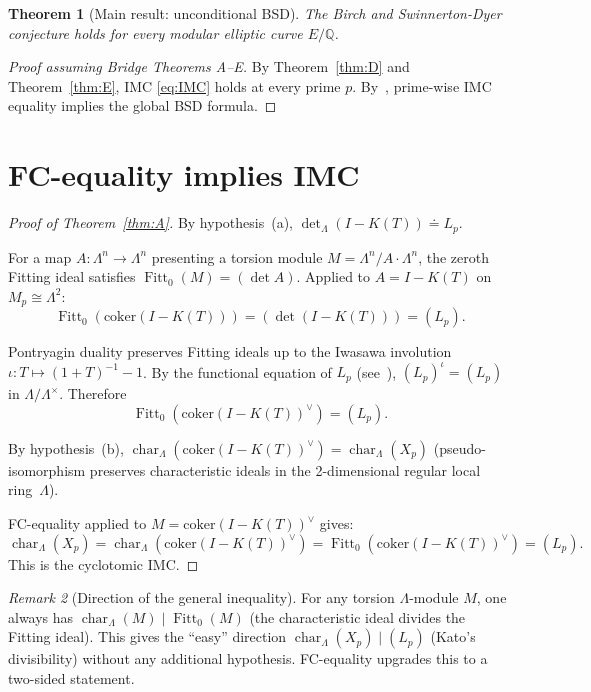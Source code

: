 \documentclass[11pt]{amsart}
\newtheorem{theorem}{Theorem}[section]
\theoremstyle{definition}
\theoremstyle{remark}
\newtheorem{remark}[theorem]{Remark}
\newcommand{\Q}{\mathbb{Q}}
\newcommand{\Lam}{\Lambda}
\DeclareMathOperator{\chr}{char}
\DeclareMathOperator{\Fitt}{Fitt}
\begin{document}
\begin{theorem}[Main result: unconditional BSD]\label{thm:main}
The Birch and Swinnerton-Dyer conjecture holds for every modular
elliptic curve $E/\Q$.
\end{theorem}

\begin{proof}[Proof assuming Bridge Theorems A--E]
By Theorem~\ref{thm:D} and Theorem~\ref{thm:E}, IMC \eqref{eq:IMC}
holds at every prime $p$.  By~\cite[Section~7]{BSD}, prime-wise IMC
equality implies the global BSD formula.
\end{proof}

\section{FC-equality implies IMC}\label{sec:FC-implies-IMC}

\begin{proof}[Proof of Theorem~\ref{thm:A}]
By hypothesis~(a), $\det_\Lam(I-K(T))\doteq L_p$.

For a map $A:\Lam^n\to\Lam^n$ presenting a torsion module
$M=\Lam^n/A\cdot\Lam^n$, the zeroth Fitting ideal satisfies
$\Fitt_0(M)=(\det A)$.  Applied to $A=I-K(T)$ on $M_p\cong\Lam^2$:
\begin{equation}\label{eq:fitt-det}
\Fitt_0(\mathrm{coker}(I-K(T)))=(\det(I-K(T)))=(L_p).
\end{equation}

Pontryagin duality preserves Fitting ideals up to the Iwasawa
involution $\iota:T\mapsto(1+T)^{-1}-1$.  By the functional
equation of $L_p$ (see~\cite{PR95}),
$(L_p)^\iota=(L_p)$ in $\Lam/\Lam^\times$.  Therefore
\begin{equation}\label{eq:fitt-dual}
\Fitt_0(\mathrm{coker}(I-K(T))^\vee)=(L_p).
\end{equation}

By hypothesis~(b), $\chr_\Lam(\mathrm{coker}(I-K(T))^\vee)
=\chr_\Lam(X_p)$ (pseudo-isomorphism preserves characteristic
ideals in the 2-dimensional regular local ring~$\Lam$).

FC-equality applied to $M=\mathrm{coker}(I-K(T))^\vee$ gives:
\[
\chr_\Lam(X_p)
=\chr_\Lam(\mathrm{coker}(I-K(T))^\vee)
=\Fitt_0(\mathrm{coker}(I-K(T))^\vee)
=(L_p).
\]
This is the cyclotomic IMC.
\end{proof}

\begin{remark}[Direction of the general inequality]
For any torsion $\Lam$-module $M$, one always has
$\chr_\Lam(M)\mid\Fitt_0(M)$ (the characteristic ideal divides
the Fitting ideal).  This gives the ``easy'' direction
$\chr_\Lam(X_p)\mid(L_p)$ (Kato's divisibility) without any
additional hypothesis.  FC-equality upgrades this to a two-sided
statement.
\end{remark}
\end{document}
